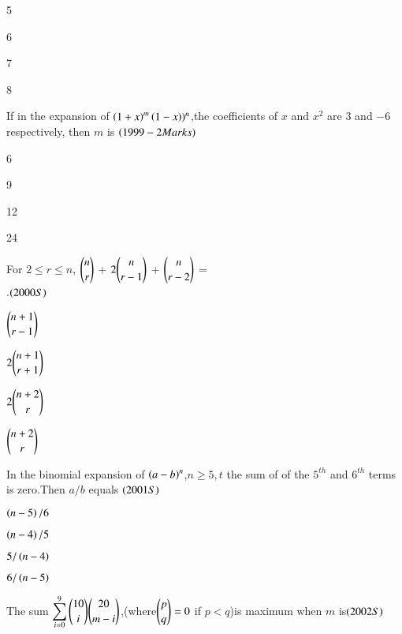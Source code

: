 \documentclass[journal,12pt,twocolumn]{IEEEtran}
\theoremstyle{remark}
\begin{document}
\begin{enumerate}
{\begin{enumerate}[label=(\alph*)]
\begin{multicols}{2}
    \item 5
    \item 6
    \item 7
    \item 8
    \end{multicols}
\end{enumerate}
\item If in the expansion of $\left(1+x\right)^m\left(1-x\right))^n$,the coefficients of $x$ and $x^2$ are $3$ and $-6$ respectively, then $m$ is
{\hfill$\left(1999-2Marks\right)$}\\
\begin{enumerate}[label=(\alph*)]
\begin{multicols}{2}
    \item 6
    \item 9
    \item 12
    \item 24
    \end{multicols}
\end{enumerate}
\item For $2\leq r\leq n$, $\dbinom{n}{r}$ + $2\dbinom{n}{r-1}$ + $\dbinom{n}{r-2}$ =\\.\hfill{$\left(2000S\right)$}
\begin{enumerate}[label=(\alph*)]\begin{multicols}{2} 
    \item $\dbinom{n+1}{r-1}$ \item $2\dbinom{n+1}{r+1}$
    \item $2\dbinom{n+2}{r}$ \item $\dbinom{n+2}{r}$
    \end{multicols}
\end{enumerate}
\item In the binomial expansion of $\left(a-b\right)^n$,$n\geq 5,t$ the sum of of the $5^{th}$ and $6^{th}$ terms is zero.Then $a/b$  equals
{\hfill $\left(2001S\right)$}
\begin{enumerate}[label=(\alph*)]
\begin{multicols}{2}
    \item $\left(n-5\right)/6$
    \item $\left(n-4\right)/5$
    \item $5/\left(n-4\right)$
    \item $6/\left(n-5\right)$
 \end{multicols}   
\end{enumerate}
\item The sum $\displaystyle\sum_{i=0}^{9} \dbinom{10}{i}\dbinom{20}{m-i}$,(where$\dbinom{p}{q}=0$ if {
$p<q$)}is maximum when $m$ is{\hfill$\left(2002S\right)$}
}
\end{enumerate}
\end{document}
